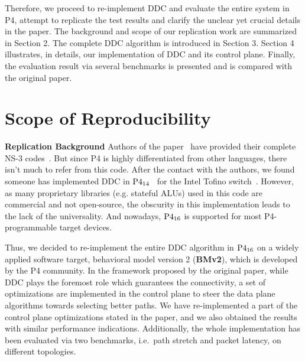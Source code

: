 Therefore, we proceed to re-implement DDC and evaluate the entire system in P4, attempt to replicate the test results and clarify the unclear yet crucial details in the paper. 
The background and scope of our replication work are summarized in Section 2. 
The complete DDC algorithm is introduced in Section 3.
Section 4 illustrates, in details, our implementation of DDC and its control plane. 
Finally, the evaluation result via several benchmarks is presented and is compared with the original paper.


\section{Scope of Reproducibility}
\textbf{Replication Background} Authors of the paper~\cite{liu2013ensuring} have provided their complete NS-3 codes~\cite{ddc-ns3}. But since P4 is highly differentiated from other languages, there isn't much to refer from this code. After the contact with the authors, we found someone has implemented DDC in  $ \rm {P4}_{14}$~\cite{ddc-p4} for the Intel Tofino switch~\cite{Tofino}. However, as many proprietary libraries (e.g. stateful ALUs) used in this code are commercial and not open-source, the obscurity in this implementation leads to the lack of the universality. And  nowadays, $\rm P4_{16}$ is supported for most P4-programmable target devices.

Thus, we decided to re-implement the entire DDC algorithm in $\rm P4_{16}$ on a widely applied software target, behavioral model version 2 (\textbf{BMv2}), which is developed by the P4 community. In the framework proposed by the original paper, while DDC plays the foremost role which guarantees the connectivity, a set of optimizations are implemented in the control plane to steer the data plane algorithms towards selecting better paths. We have re-implemented a part of the control plane optimizations stated in the paper, and we also obtained the results with similar performance indications. Additionally, the whole implementation has been evaluated via two benchmarks, i.e.\ path stretch and packet latency, on different topologies.

